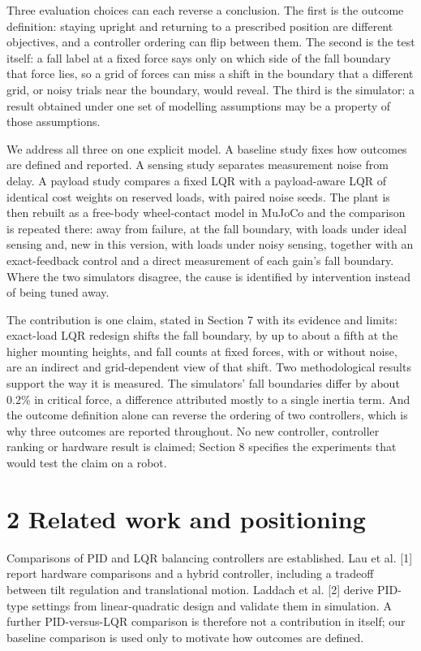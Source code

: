 \documentclass[11pt,a4paper]{article}
\begin{document}
Three evaluation choices can each reverse a conclusion. The first is the outcome definition: staying upright and returning to a prescribed position are different objectives, and a controller ordering can flip between them. The second is the test itself: a fall label at a fixed force says only on which side of the fall boundary that force lies, so a grid of forces can miss a shift in the boundary that a different grid, or noisy trials near the boundary, would reveal. The third is the simulator: a result obtained under one set of modelling assumptions may be a property of those assumptions.

We address all three on one explicit model. A baseline study fixes how outcomes are defined and reported. A sensing study separates measurement noise from delay. A payload study compares a fixed LQR with a payload-aware LQR of identical cost weights on reserved loads, with paired noise seeds. The plant is then rebuilt as a free-body wheel-contact model in MuJoCo and the comparison is repeated there: away from failure, at the fall boundary, with loads under ideal sensing and, new in this version, with loads under noisy sensing, together with an exact-feedback control and a direct measurement of each gain's fall boundary. Where the two simulators disagree, the cause is identified by intervention instead of being tuned away.

The contribution is one claim, stated in Section 7 with its evidence and limits: exact-load LQR redesign shifts the fall boundary, by up to about a fifth at the higher mounting heights, and fall counts at fixed forces, with or without noise, are an indirect and grid-dependent view of that shift. Two methodological results support the way it is measured. The simulators' fall boundaries differ by about 0.2\% in critical force, a difference attributed mostly to a single inertia term. And the outcome definition alone can reverse the ordering of two controllers, which is why three outcomes are reported throughout. No new controller, controller ranking or hardware result is claimed; Section 8 specifies the experiments that would test the claim on a robot.

\section*{2 Related work and positioning}
Comparisons of PID and LQR balancing controllers are established. Lau et al. [1] report hardware comparisons and a hybrid controller, including a tradeoff between tilt regulation and translational motion. Laddach et al. [2] derive PID-type settings from linear-quadratic design and validate them in simulation. A further PID-versus-LQR comparison is therefore not a contribution in itself; our baseline comparison is used only to motivate how outcomes are defined.
\end{document}

